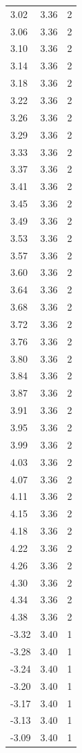 \begin{longtable}{lrr}
  3.02 & 3.36 & 2 \\
  3.06 & 3.36 & 2 \\
  3.10 & 3.36 & 2 \\
  3.14 & 3.36 & 2 \\
  3.18 & 3.36 & 2 \\
  3.22 & 3.36 & 2 \\
  3.26 & 3.36 & 2 \\
  3.29 & 3.36 & 2 \\
  3.33 & 3.36 & 2 \\
  3.37 & 3.36 & 2 \\
  3.41 & 3.36 & 2 \\
  3.45 & 3.36 & 2 \\
  3.49 & 3.36 & 2 \\
  3.53 & 3.36 & 2 \\
  3.57 & 3.36 & 2 \\
  3.60 & 3.36 & 2 \\
  3.64 & 3.36 & 2 \\
  3.68 & 3.36 & 2 \\
  3.72 & 3.36 & 2 \\
  3.76 & 3.36 & 2 \\
  3.80 & 3.36 & 2 \\
  3.84 & 3.36 & 2 \\
  3.87 & 3.36 & 2 \\
  3.91 & 3.36 & 2 \\
  3.95 & 3.36 & 2 \\
  3.99 & 3.36 & 2 \\
  4.03 & 3.36 & 2 \\
  4.07 & 3.36 & 2 \\
  4.11 & 3.36 & 2 \\
  4.15 & 3.36 & 2 \\
  4.18 & 3.36 & 2 \\
  4.22 & 3.36 & 2 \\
  4.26 & 3.36 & 2 \\
  4.30 & 3.36 & 2 \\
  4.34 & 3.36 & 2 \\
  4.38 & 3.36 & 2 \\
  -3.32 & 3.40 & 1 \\
  -3.28 & 3.40 & 1 \\
  -3.24 & 3.40 & 1 \\
  -3.20 & 3.40 & 1 \\
  -3.17 & 3.40 & 1 \\
  -3.13 & 3.40 & 1 \\
  -3.09 & 3.40 & 1 \\

\end{longtable}
